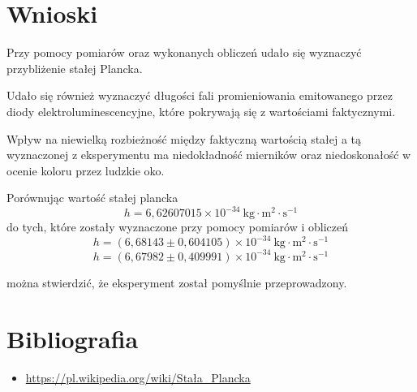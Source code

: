 \documentclass[12pt]{article}
\begin{document}
\section{Wnioski}

Przy pomocy pomiarów oraz wykonanych obliczeń udało się wyznaczyć przybliżenie stałej Plancka.

Udało się również wyznaczyć długości fali promieniowania emitowanego przez diody elektroluminescencyjne,
które pokrywają się z wartościami faktycznymi.

Wpływ na niewielką rozbieżność między faktyczną wartością stałej a tą wyznaczonej z eksperymentu 
ma niedokładność mierników oraz niedoskonałość w ocenie koloru przez ludzkie oko. \bigskip

Porównując wartość stałej plancka 
\[ h = 6,62607015 \times 10^{-34} \ \textrm{kg} \cdot \textrm{m}^2 \cdot \textrm{s}^{-1} \]
do tych, które zostały wyznaczone przy pomocy pomiarów i obliczeń
\[ h = (6,68143 \pm 0,604105) \times 10^{-34} \ \textrm{kg} \cdot \textrm{m}^2 \cdot \textrm{s}^{-1} \] 
\[ h = (6,67982 \pm 0,409991) \times 10^{-34} \ \textrm{kg} \cdot \textrm{m}^2 \cdot \textrm{s}^{-1} \] 

można stwierdzić, że eksperyment został pomyślnie przeprowadzony.

\section{Bibliografia}

\begin{itemize}
    \item \url{https://pl.wikipedia.org/wiki/Stała_Plancka}
\end{itemize}
\end{document}

